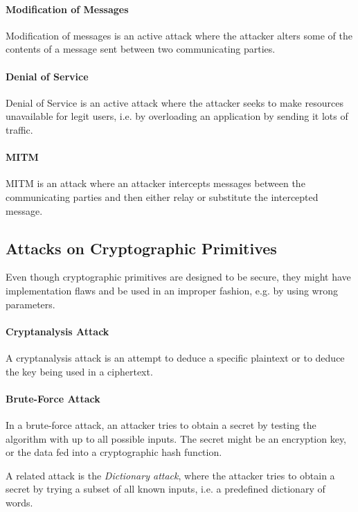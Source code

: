 \documentclass[pdftex,english,10pt,b5paper,twoside]{book}
\begin{document}
\paragraph{Modification of Messages} Modification of messages is an active
attack where the attacker alters some of the contents of a message sent between
two communicating parties.

\paragraph{Denial of Service} Denial of Service is an active attack where the
attacker seeks to make resources unavailable for legit users, i.e. by
overloading an application by sending it lots of traffic.

\paragraph{\acl{MITM}} \ac{MITM} is an attack where an attacker intercepts messages
between the communicating parties and then either relay or substitute the
intercepted message.

\subsection{Attacks on Cryptographic Primitives}

Even though cryptographic primitives are designed to be secure, they might have
implementation flaws and be used in an improper fashion, e.g. by using wrong
parameters.

\paragraph{Cryptanalysis Attack} A cryptanalysis attack is an attempt to deduce
a specific plaintext or to deduce the key being used in a ciphertext.

\paragraph{Brute-Force Attack} In a brute-force attack, an attacker tries
to obtain a secret by testing the algorithm with up to all possible inputs. The
secret might be an encryption key, or the data fed into a cryptographic hash
function.

A related attack is the \emph{Dictionary attack}, where the attacker
tries to obtain a secret by trying a subset of all known inputs, i.e. a
predefined dictionary of words.
\end{document}
